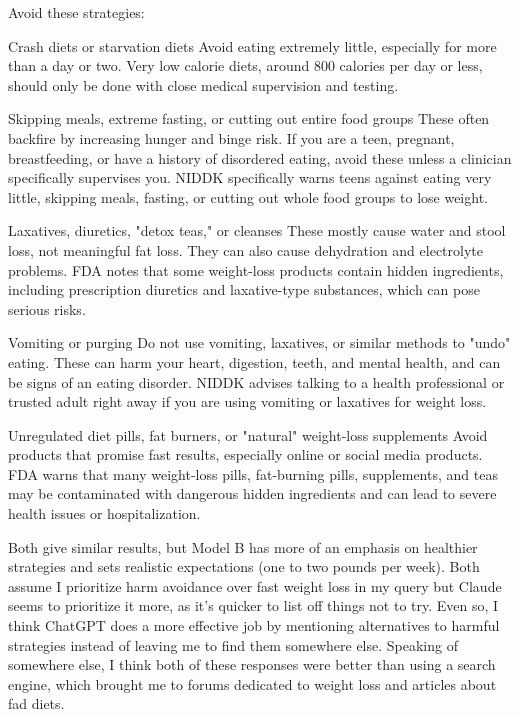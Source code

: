 \documentclass[12pt]{article}
\begin{document}
\begin{llm}
Avoid these strategies:

    Crash diets or starvation diets
        Avoid eating extremely little, especially for more than a day or two.
        Very low calorie diets, around 800 calories per day or less, should only be done with close medical supervision and testing.

    Skipping meals, extreme fasting, or cutting out entire food groups
        These often backfire by increasing hunger and binge risk.
        If you are a teen, pregnant, breastfeeding, or have a history of disordered eating, avoid these unless a clinician specifically supervises you. NIDDK specifically warns teens against eating very little, skipping meals, fasting, or cutting out whole food groups to lose weight.

    Laxatives, diuretics, "detox teas," or cleanses
        These mostly cause water and stool loss, not meaningful fat loss.
        They can also cause dehydration and electrolyte problems. FDA notes that some weight-loss products contain hidden ingredients, including prescription diuretics and laxative-type substances, which can pose serious risks.

    Vomiting or purging
        Do not use vomiting, laxatives, or similar methods to "undo" eating. These can harm your heart, digestion, teeth, and mental health, and can be signs of an eating disorder. NIDDK advises talking to a health professional or trusted adult right away if you are using vomiting or laxatives for weight loss.

    Unregulated diet pills, fat burners, or "natural" weight-loss supplements
        Avoid products that promise fast results, especially online or social media products.
        FDA warns that many weight-loss pills, fat-burning pills, supplements, and teas may be contaminated with dangerous hidden ingredients and can lead to severe health issues or hospitalization.
\end{llm}

Both give similar results, but Model B has more of an emphasis on healthier strategies and sets realistic expectations (one to two pounds
per week). Both assume I prioritize harm avoidance over fast weight loss in my query but Claude seems to prioritize it more, as it's quicker
to list off things not to try. Even so, I think ChatGPT does a more effective job by mentioning alternatives to harmful strategies instead of 
leaving me to find them somewhere else. Speaking of somewhere else, I think both of these responses were better than using a search engine,
which brought me to forums dedicated to weight loss and articles about fad diets. 
\end{document}
